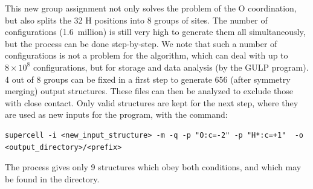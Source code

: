 \documentclass[a4paper,10pt]{article}
\begin{document}
This new group assignment not only solves the problem of the O coordination, but also splits the 32 H positions into 8 groups of sites. The number of configurations (1.6~million) is still very high to generate them all simultaneously, but the process can be done step-by-step. We note that such a number of configurations is not a problem for the\sups{} algorithm, which can deal with up to $8\times{10^8}$ configurations, but for storage and data analysis (by the GULP program). 4 out of 8 groups can be fixed in a first step to generate 656 (after symmetry merging) output structures. These files can then be analyzed to exclude those with  close contact. Only valid structures are kept for the next step, where they are used as new inputs for the \sups{} program, with the command:
\begin{Verbatim}[breaklines]
  supercell -i <new_input_structure> -m -q -p "O:c=-2" -p "H*:c=+1"  -o <output_directory>/<prefix>
\end{Verbatim}
The process gives only 9 structures which obey both conditions, and which may be found in the \linebreak {} directory.
\end{document}
